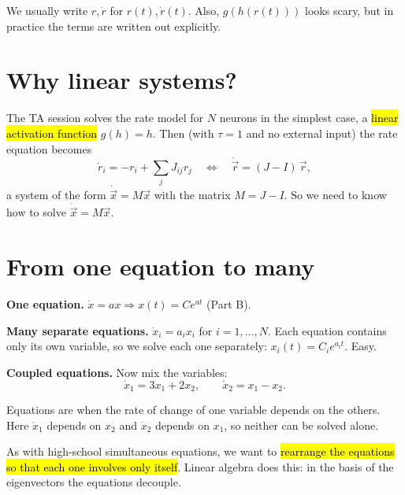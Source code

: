 \begin{pitfall}[Shorthand]
We usually write $r,\dot r$ for $r(t),\dot r(t)$. Also, $g(h(r(t)))$ looks scary, but in practice the terms are written out explicitly.
\end{pitfall}


\section{Why linear systems?}

The TA session solves the rate model for $N$ neurons in the simplest case, a \hl{linear activation function} $g(h)=h$.
Then (with $\tau=1$ and no external input) the rate equation becomes
\[ \dot r_i = -r_i + \sum_{j} J_{ij} r_j \quad\iff\quad \dot{\vec r} = (J - I)\,\vec r, \]
a system of the form $\dot{\vec x} = M\vec x$ with the matrix $M = J-I$. So we need to know how to solve $\dot{\vec x} = M\vec x$.

\section{From one equation to many}

\textbf{One equation.} $\dot x = ax \Rightarrow x(t) = Ce^{at}$ (Part B).

\textbf{Many separate equations.} $\dot x_i = a_ix_i$ for $i=1,\dots,N$. Each equation contains only its own variable, so we solve each one
separately: $x_i(t) = C_ie^{a_it}$. Easy.

\textbf{Coupled equations.} Now mix the variables:
\[ \dot x_1 = 3x_1 + 2x_2, \qquad \dot x_2 = x_1 - x_2. \]

\begin{defn}[Coupled]
Equations are  when the rate of change of one variable depends on the others. Here $\dot x_1$ depends on
$x_2$ and $\dot x_2$ depends on $x_1$, so neither can be solved alone.
\end{defn}

\begin{intuition}
As with high-school simultaneous equations, we want to \hl{rearrange the equations so that each one involves only itself}.
Linear algebra does this: in the basis of the eigenvectors the equations decouple.
\end{intuition}

